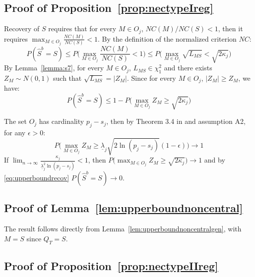 \documentclass[aos]{imsart}
\theoremstyle{plain}
\begin{document}
\begin{supplement}
\subsection{Proof of Proposition~\ref{prop:nectypeIreg}}

Recovery of $S$ requires that for every $M\in O_j$, $NC(M)/NC(S)<1$, then it requires $\max_{M\in O_j}\frac{NC(M)}{NC(S)}<1$. By the definition of the normalized criterion $NC$:
$$P(\hat{S}^b=S) \leq P\Big(\max_{M\in O_j}\frac{NC(M)}{NC(S)}<1\Big)\leq  P\big(\max_{M\in O_j}\sqrt{L_{MS}}<\sqrt{2\kappa_j}\Big)$$
By Lemma~\ref{lemma:s7}, for every $M\in O_j$, $L_{MS}\in \chi^2_1$ and there exists $Z_M\sim N(0,1)$ such that $\sqrt{L_{MS}}=|Z_M|$. Since for every $M\in O_j$, $|Z_M|\geq Z_M$, we have:
\begin{equation}\label{eq:upperboundrecov}
    P(\hat{S}^b=S) \leq  1-P\big(\max_{M\in O_j}Z_M\geq\sqrt{2\kappa_j}\Big)
\end{equation}

The set $O_j$ has cardinality $p_j-s_j$, then by Theorem 3.4 in \cite{hartigan} and assumption A2, for any $\epsilon>0$:
$$P\big(\max_{M\in O_j}Z_M \geq \underline{\lambda}_j \sqrt{2 \ln(p_j-s_j)}(1-\epsilon)\big) \to 1$$
If $\lim_{n\to\infty}\frac{\kappa_j}{\underline{\lambda}_j^2\ln(p_j-s_j)} <1$, then $P\big(\max_{M\in O_j}Z_M\geq\sqrt{2\kappa_j}\big) \to 1$ and by \eqref{eq:upperboundrecov} $P(\hat{S}^b=S) \to 0$.

\subsection{Proof of Lemma~\ref{lem:upperboundnoncentral}}
The result follows directly from Lemma~\ref{lem:upperboundnoncentralgen}, with $M=S$ since $Q_T=S$.

\subsection{Proof of Proposition~\ref{prop:nectypeIIreg}}


\end{supplement}
\end{document}
